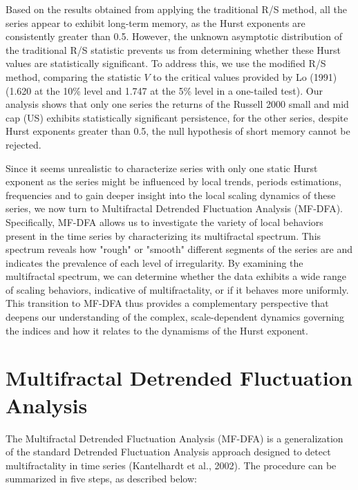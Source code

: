 \documentclass[11pt]{extarticle}
\begin{document}
\FloatBarrier


Based on the results obtained from applying the traditional R/S method, all the series appear to exhibit long-term memory,
as the Hurst exponents are consistently greater than 0.5. However, the unknown asymptotic distribution of the traditional R/S
statistic prevents us from determining whether these Hurst values are statistically significant. To address this, we use the modified
R/S method, comparing the statistic \( V \) to the critical values provided by Lo (1991) (1.620 at the 10\% level and 1.747 at the 5\%
level in a one-tailed test). Our analysis shows that only one series the returns of the Russell 2000 small and mid cap (US) exhibits
statistically significant persistence, for the other series, despite Hurst exponents greater than 0.5, the null hypothesis of short memory cannot be rejected.

Since it seems unrealistic to characterize series with only one static Hurst exponent as the series might be influenced by local trends,
periods estimations, frequencies and to gain deeper insight into
the local scaling dynamics of these series, we now turn to Multifractal Detrended Fluctuation Analysis (MF-DFA).
Specifically, MF-DFA allows us to investigate the variety of local behaviors present in the time series by characterizing its multifractal
spectrum. This spectrum reveals how "rough" or "smooth" different segments of the series are and indicates the prevalence of each level of
irregularity. By examining the multifractal spectrum, we can determine whether the data exhibits a wide range of scaling behaviors, indicative
of multifractality, or if it behaves more uniformly. This transition to MF-DFA thus provides a complementary perspective that deepens our understanding
of the complex, scale-dependent dynamics governing the indices and how it relates to the dynamisms of the Hurst exponent.

\section{Multifractal Detrended Fluctuation Analysis}
\label{sec:mfdfa}

The Multifractal Detrended Fluctuation Analysis (MF-DFA) is a generalization of the standard Detrended Fluctuation
Analysis approach designed to detect multifractality in time series (Kantelhardt et al., 2002). The procedure can be summarized in five steps, as described below:
\end{document}
